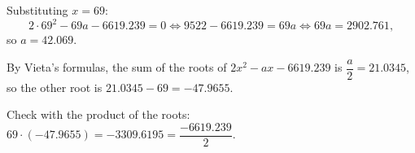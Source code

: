Substituting $x=69$:
\[2\cdot69^2-69a-6619.239=0\iff 9522-6619.239=69a\iff 69a=2902.761,\]
so $a=\boxed{42.069}$.

By Vieta's formulas, the sum of the roots of $2x^2-ax-6619.239$ is $\dfrac{a}{2}=\boxed{21.0345}$, so the other root is $21.0345-69=\boxed{-47.9655}$.

Check with the product of the roots: $69\cdot(-47.9655)=-3309.6195=\dfrac{-6619.239}{2}$.
